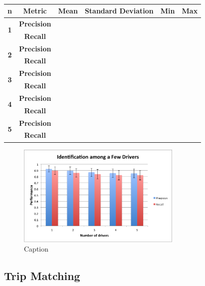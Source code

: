\documentclass{article}
\begin{document}
\begin{table}[h]
\centering

\begin{tabular}{|c|c|c|c|c|c|} \hline
{\bf n} & {\bf Metric} & {\bf Mean} & {\bf Standard Deviation} & {\bf Min} & {\bf Max} \\ \hline

\multirow{2}{*}{{\bf 1}} & {\bf Precision} & & & & \\  
& {\bf Recall} & & & & \\ \hline

\multirow{2}{*}{{\bf 2}} & {\bf Precision} & & & &\\  
& {\bf Recall} & & & &\\ \hline

\multirow{2}{*}{{\bf 3}} & {\bf Precision} & & & &\\  
& {\bf Recall} & & & &\\ \hline

\multirow{2}{*}{{\bf 4}} & {\bf Precision} & & & &\\  
& {\bf Recall} & & & &\\ \hline

\multirow{2}{*}{{\bf 5}} & {\bf Precision} & & & &\\  
& {\bf Recall} & & & &\\ \hline

\end{tabular}
\caption{}
\label{tab:family}
\end{table}

\begin{figure}
\centering
\includegraphics[width = 0.7\textwidth]{few_drivers.png}
\caption{Caption}
\label{fig:few}
\end{figure}



\subsection{Trip Matching}
\end{document}

